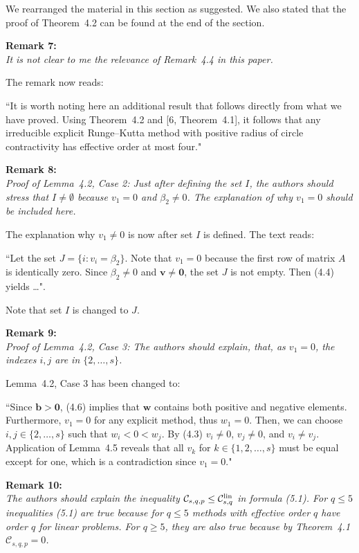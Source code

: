\documentclass[12pt]{article}
\newcommand{\remark}[2]{\vspace{25pt} \noindent \textbf{Remark #1:\newline} \textit{#2}\vspace{15pt}}
\renewcommand{\newline}{\vspace{15pt}\\}
\newcommand{\sspcoef}{\mathcal{C}}
\newcommand{\clin}{\sspcoef^{\textnormal{lin}}_{s,q}}
\newcommand{\david}[1]{\textcolor{red}{\\\textbf{D: \footnotesize #1}\\}}
\begin{document}
We rearranged the material in this section as suggested.
We also stated that the proof of Theorem~4.2 can be found at the end of the section.


\remark{7}{
It is not clear to me the relevance of Remark~4.4 in this paper.}

The remark now reads:

``It is worth noting here an additional result that 
follows directly from what we have proved.
Using Theorem~4.2 and [6, Theorem~4.1], 
it follows that any irreducible explicit Runge--Kutta method with positive radius of
circle contractivity has effective order at most four."

\remark{8}{
Proof of Lemma~4.2, Case 2: Just after defining the set $I$, the authors should stress that
$I \neq \emptyset$ because $v_1 = 0$ and $\beta_2 \neq 0$.
The explanation of why $v_1 = 0$ should be included
here.}

The explanation why $v_1 \neq 0$ is now after set $I$ is defined. The text reads:

``Let the set $J = \{i : v_i = \beta_2\}$. 
Note that $v_1 = 0$ because the first row of matrix $A$ is identically zero.
Since $\beta_2 \neq 0$ and $ \bm{v} \neq \bm{0}$, the set $J$ is not empty.
Then (4.4) yields \dots".

Note that set $I$ is changed to $J$.
	
\remark{9}{
Proof of Lemma~4.2, Case 3: The authors should explain, that, as $v_1 = 0$, the 
indexes $i,j$ are in $\{2,\dots,s\}$.}

Lemma~4.2, Case 3 has been changed to:

``Since $\bm{b} > \bm{0}$, (4.6) implies that $\bm{w}$ contains both positive 
and negative elements. 
Furthermore, $v_1=0$ for any explicit method, thus $w_1=0$.
Then, we can choose $i, j \in \{2, \dots, s\}$ such that $w_i < 0 < w_j$.
By (4.3) $v_i\ne 0$, $v_j\ne 0$, and $v_i\ne v_j$.
Application of Lemma~4.5 reveals that all $v_k$ for 
$k \in\{1,2,\dots,s\}$ must be equal except for one, which is a contradiction
since $v_1 = 0$."

\remark{10}{
The authors should explain the inequality $\sspcoef_{s,q,p} \leq \clin$ in formula (5.1). 
For $q \leq 5$ inequalities (5.1) are true because for $q \leq 5$ methods with effective 
order $q$ have order $q$ for linear problems. 
For $q \geq 5$, they are also true because by Theorem~4.1 $\sspcoef_{s,q,p}  = 0$.}
\end{document}

